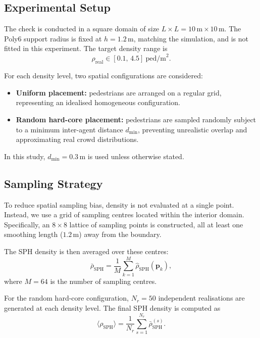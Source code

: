 \documentclass[preprint,12pt]{elsarticle}
\providecommand{\FloatBarrier}{}
\let\origsubsection\subsection
\renewcommand{\subsection}{\FloatBarrier\origsubsection}
\begin{document}
\subsection{Experimental Setup}
\label{app:calib_setup}

The check is conducted in a square domain of size
$L \times L = 10\,\mathrm{m} \times 10\,\mathrm{m}$.
The Poly6 support radius is fixed at $h=1.2$\,m, matching the simulation,
and is not fitted in this experiment.
The target density range is
\[
\rho_{\mathrm{real}} \in [0.1,\,4.5] \ \mathrm{ped/m}^2.
\]

For each density level, two spatial configurations are considered:

\begin{itemize}
    \item \textbf{Uniform placement:}
    pedestrians are arranged on a regular grid, representing an idealised
    homogeneous configuration.

    \item \textbf{Random hard-core placement:}
    pedestrians are sampled randomly subject to a minimum inter-agent distance
    $d_{\min}$, preventing unrealistic overlap and approximating real crowd
    distributions.
\end{itemize}

In this study, $d_{\min}=0.3$\,m is used unless otherwise stated.


\subsection{Sampling Strategy}
\label{app:sampling_strategy}

To reduce spatial sampling bias, density is not evaluated at a single point.
Instead, we use a grid of sampling centres located within the interior domain.
Specifically, an $8\times8$ lattice of sampling points is constructed, all at
least one smoothing length ($1.2$\,m) away from the boundary.

The SPH density is then averaged over these centres:
\begin{equation}
\bar{\rho}_{\mathrm{SPH}}
=
\frac{1}{M}
\sum_{k=1}^{M}
\hat{\rho}_{\mathrm{SPH}}(\mathbf{p}_k),
\end{equation}
where $M=64$ is the number of sampling centres.

For the random hard-core configuration, $N_r=50$ independent realisations are
generated at each density level. The final SPH density is computed as
\begin{equation}
\langle \rho_{\mathrm{SPH}} \rangle
=
\frac{1}{N_r}
\sum_{s=1}^{N_r}
\bar{\rho}_{\mathrm{SPH}}^{(s)}.
\end{equation}
\end{document}
